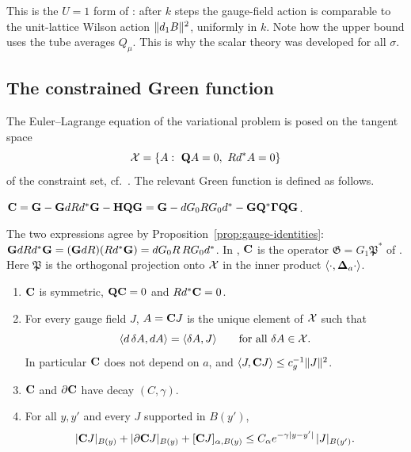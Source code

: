This is the $U=1$ form of \cite[(1.66)--(1.67)]{BalPropI}: after $k$ steps the gauge-field action is comparable to the unit-lattice Wilson action $\|d_1 B\|^2$, uniformly in $k$. Note how the upper bound uses the tube averages $Q_\mu$. This is why the scalar theory was developed for all $\sigma$.

\subsection{The constrained Green function}\label{ss:11.5}

The Euler--Lagrange equation of the variational problem is posed on the tangent space
\[
\cX=\{A:\ \bQ A=0,\ Rd^*A=0\}
\]
of the constraint set, cf.\ \cite[(100)--(111)]{BalVar}. The relevant Green function is defined as follows.

\begin{definition}\label{x:11.6}
$\mathbf C=\mathbf G-\mathbf G dRd^*\mathbf G-\mathbf H\mathbf Q\mathbf G=\mathbf G-dG_0RG_0d^*-\mathbf G\mathbf Q^*\boldsymbol\Gamma\mathbf Q\mathbf G$.
\end{definition}

The two expressions agree by Proposition~\ref{prop:gauge-identities}: $\mathbf G dRd^*\mathbf G=(\mathbf G dR)(Rd^*\mathbf G)=dG_0R\,RG_0d^*$. In \cite{BalBackground,BalVar}, $\mathbf C$ is the operator $\mathfrak G=G_1\mathfrak P^*$ of \cite[(3.148)--(3.153)]{BalBackground}. Here $\mathfrak P$ is the orthogonal projection onto $\mathcal X$ in the inner product $\langle \cdot,\boldsymbol{\Delta}_a\cdot\rangle$.

\begin{theorem}\label{thm:C-gauge}
\begin{enumerate}[label=(\alph*)]
\item $\mathbf C$ is symmetric, $\mathbf Q\mathbf C=0$ and $Rd^*\mathbf C=0$.
\item For every gauge field $J$, $A=\mathbf C J$ is the unique element of $\mathcal X$ such that
\[
\langle d\,\delta A,dA\rangle=\langle \delta A,J\rangle\qquad\text{for all }\delta A\in\mathcal X .
\]
In particular $\mathbf C$ does not depend on $a$, and $\langle J,\mathbf C J\rangle\le c_g^{-1}\|J\|^2$.
\item $\mathbf C$ and $\partial\mathbf C$ have decay $(C,\gamma)$.
\item For all $y,y'$ and every $J$ supported in $B(y')$,
\[
|\mathbf C J|_{B(y)}+|\partial\mathbf C J|_{B(y)}+[\mathbf C J]_{\alpha,B(y)}\le C_\alpha e^{-\gamma|y-y'|}\,|J|_{B(y')} .
\]
\end{enumerate}
\end{theorem}

